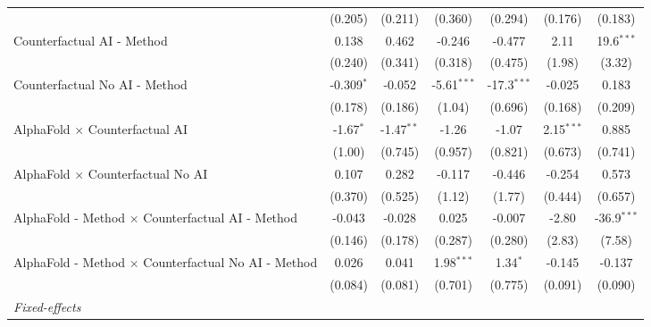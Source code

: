 \begin{tabular}{lcccccc}
                                                              & (0.205)      & (0.211)      & (0.360)       & (0.294)       & (0.176)      & (0.183)\\   
   Counterfactual AI - Method                                 & 0.138        & 0.462        & -0.246        & -0.477        & 2.11         & 19.6$^{***}$\\   
                                                              & (0.240)      & (0.341)      & (0.318)       & (0.475)       & (1.98)       & (3.32)\\   
   Counterfactual No AI - Method                              & -0.309$^{*}$ & -0.052       & -5.61$^{***}$ & -17.3$^{***}$ & -0.025       & 0.183\\   
                                                              & (0.178)      & (0.186)      & (1.04)        & (0.696)       & (0.168)      & (0.209)\\   
   AlphaFold $\times$ Counterfactual AI                       & -1.67$^{*}$  & -1.47$^{**}$ & -1.26         & -1.07         & 2.15$^{***}$ & 0.885\\   
                                                              & (1.00)       & (0.745)      & (0.957)       & (0.821)       & (0.673)      & (0.741)\\   
   AlphaFold $\times$ Counterfactual No AI                    & 0.107        & 0.282        & -0.117        & -0.446        & -0.254       & 0.573\\   
                                                              & (0.370)      & (0.525)      & (1.12)        & (1.77)        & (0.444)      & (0.657)\\   
   AlphaFold - Method $\times$ Counterfactual AI - Method     & -0.043       & -0.028       & 0.025         & -0.007        & -2.80        & -36.9$^{***}$\\   
                                                              & (0.146)      & (0.178)      & (0.287)       & (0.280)       & (2.83)       & (7.58)\\   
   AlphaFold - Method $\times$ Counterfactual No AI - Method  & 0.026        & 0.041        & 1.98$^{***}$  & 1.34$^{*}$    & -0.145       & -0.137\\   
                                                              & (0.084)      & (0.081)      & (0.701)       & (0.775)       & (0.091)      & (0.090)\\   
   \midrule
   \emph{Fixed-effects}\\

\end{tabular}
